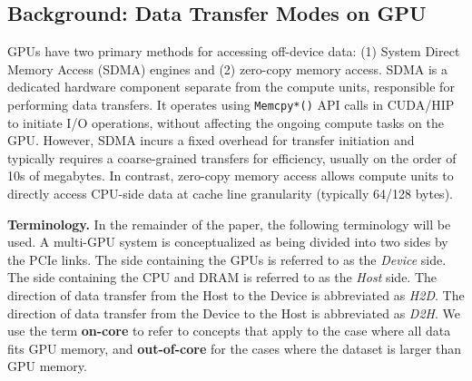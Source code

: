 \begin{comment}
Many GPU applications are not thirsty for higher CPU-GPU IO bandwidth like query processing.
The main driving force for the evolution of GPUs is the high computation required by Deep Learning (DL) applications.
The IO resources of the GPUs running DL applications are largely left idle, which can be used to scale the IO throughput for other GPUs.
We can collocate the IO-bound GPU data analytics applications with the compute-intensive DL applications in a multi-GPU system, and \textit{redistribute the idle IO resources on the GPUs that running DL applications to the GPU running data analytics}.
\end{comment}

\subsection{Background: Data Transfer Modes on GPU}
\label{sec:SDMA}
GPUs have two primary methods for accessing off-device data: (1) System Direct Memory Access (SDMA) engines and (2) zero-copy memory access.
SDMA is a dedicated hardware component separate from the compute units, responsible for performing data transfers. 
It operates using \texttt{Memcpy*()} API calls in CUDA/HIP to initiate I/O operations, without affecting the ongoing compute tasks on the GPU. 
However, SDMA incurs a fixed overhead for transfer initiation and typically requires a coarse-grained transfers for efficiency, usually on the order of 10s of megabytes.
In contrast, zero-copy memory access allows compute units to directly access CPU-side data at cache line granularity (typically 64/128 bytes). 

\noindent
\textbf{Terminology.}
In the remainder of the paper, the following terminology will be used.
A multi-GPU system is conceptualized as being divided into two sides by the PCIe links.
The side containing the GPUs is referred to as the \textit{Device} side.
The side containing the CPU and DRAM is referred to as the \textit{Host} side.
The direction of data transfer from the Host to the Device is abbreviated as \textit{H2D}.
The direction of data transfer from the Device to the Host is abbreviated as \textit{D2H}.
We use the term \textbf{on-core} to refer to concepts that apply to the case where all data fits GPU memory, and \textbf{out-of-core} for the cases where the dataset is larger than GPU memory.


